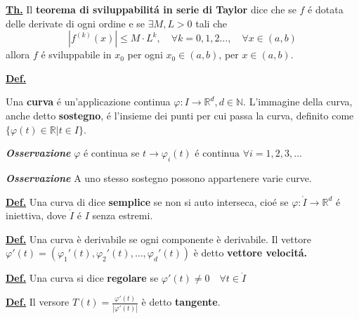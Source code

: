 \documentclass[a4paper,10pt]{article} %
\renewcommand{\b}[1]{%
    {\textbf{#1}}}
\newcommand{\ldef}[1]{%
    {\smallbreak\par\tiny\textbf{\underline{Def.}} {#1} \smallbreak}}
\newcommand{\ltheorem}[1]{%
    {\smallbreak\par\tiny\textbf{\underline{Th.}} {#1} \smallbreak\par}}
\newcommand{\ldim}[1]{%
    {\smallbreak\par\tiny\emph{\textbf{Dimostrazione}} {#1} \par}}
\newcommand{\loss}[1]{%
    {\smallbreak\par\tiny\emph{\textbf{Osservazione}} {#1} \par}}
\renewcommand{\ldim}[1]{{}}
\begin{document}
\begin{multicols}{6}
\ltheorem{
    Il \b{teorema di sviluppabilit\'{a} in serie di Taylor} dice che se $f$ \'{e} dotata delle derivate di ogni ordine e se $\exists M, L > 0$ tali che 
    \[
    \left| f^{(k)} (x) \right| \leq M\cdot L^k, \quad \forall k = 0,1,2 \dots, \quad \forall x \in (a,b)
    \]
    allora $f$ \'{e} sviluppabile in $x_0$ per ogni $x_0 \in (a, b)$, per $x \in (a,b)$.
    \ldim{
        Vogliamo dimostrare che il resto dello sviluppo di Taylor tende a 0:
        \[
        R(n) = f(x) - \sum_{k=0}^n \frac{f^{(k)} (x_0)}{k!} (x - x_0)^k \quad \longrightarrow 0, \quad n \rightarrow \infty
        \]
        Ora scriviamolo in forma di Lagrange:
        \[
        R_n(x) = \frac{\left| f^{(n+1)} (\xi) \right| } { (n + 1)!} (x - x_0)^{n + 1}, \quad \xi \in (x, x_0)
        \]
        Siccome il valore massimo di $(x - x_0)$ \'{e} in $(b - a)$:
        \[
        \left| R_n(x) \right| \leq \frac{ \left| f^{(n + 1)} (\xi) \right|} { (n + 1) !} ( b - a)^{n+1} 
        \leq \frac{ML^{n+1}}{(n+1)!} (b-a)^{n+1} \longrightarrow 0
        \]
} 
}





\medbreak\dotfill\medbreak






\ldef{
    Una \b{curva} \'{e} un'applicazione continua $\varphi : I \rightarrow \mathbb{R}^d, d\in \mathbb{N}$. L'immagine della curva, anche detto \b{sostegno}, \'{e} l'insieme dei punti per cui passa la curva, definito come $\{\varphi(t) \in \mathbb{R} | t \in I \}$.
    \loss{
        $\varphi$ \'{e} continua se $t \rightarrow \varphi_i(t) \text{ \'{e} continua } \forall i = 1,2,3,\dots$
    }
    \loss{
        A uno stesso sostegno possono appartenere varie curve.
    }
}

\ldef{
    Una curva di dice \b{semplice} se non si auto interseca, cio\'{e} se $\varphi : \mathring{I} \longrightarrow \mathbb{R}^d$ \'{e} iniettiva, dove $\mathring{I}$ \'{e} $I$ senza estremi.
}

\ldef{
    Una curva è derivabile se ogni componente è derivabile. Il vettore $\varphi' (t) = (\varphi_1'(t), \varphi_2'(t), \dots, \varphi_d'(t))$ è detto \b{vettore velocit\'{a}.}
}

\ldef{
    Una curva si dice \b{regolare} se $ \varphi'(t) \neq 0 \quad \forall t \in \mathring{I} $
}

\ldef{
    Il versore $\displaystyle T(t) = \frac{\varphi'(t)}{ | \varphi'(t)|}$ è detto \b{tangente}.
}


\end{multicols}
\end{document}
